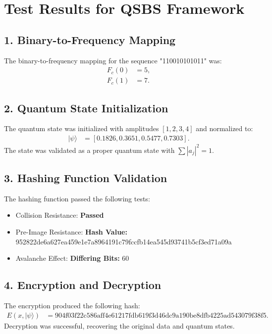 \documentclass{article}
\theoremstyle{plain}
\begin{document}
\section*{Test Results for QSBS Framework}

\subsection*{1. Binary-to-Frequency Mapping}
The binary-to-frequency mapping for the sequence "110010101011" was:
\begin{align*}
F_c(0) &= 5, \\
F_c(1) &= 7.
\end{align*}

\subsection*{2. Quantum State Initialization}
The quantum state was initialized with amplitudes $[1, 2, 3, 4]$ and normalized to:
\begin{align*}
|\psi\rangle &= [0.1826, 0.3651, 0.5477, 0.7303].
\end{align*}
The state was validated as a proper quantum state with $\sum |a_j|^2 = 1$.

\subsection*{3. Hashing Function Validation}
The hashing function passed the following tests:
\begin{itemize}
    \item Collision Resistance: \textbf{Passed}
    \item Pre-Image Resistance: \textbf{Hash Value:} 952822de6a627ea459e1e7a8964191c79fccfb14ea545d93741b5cf3ed71a09a
    \item Avalanche Effect: \textbf{Differing Bits:} 60
\end{itemize}

\subsection*{4. Encryption and Decryption}
The encryption produced the following hash:
\begin{align*}
E(x, |\psi\rangle) &= \text{904f03f22c586aff4e61217fdb619f3d46dc9a190be8dfb4225ad543079f38f5}.
\end{align*}
Decryption was successful, recovering the original data and quantum states.
\end{document}
